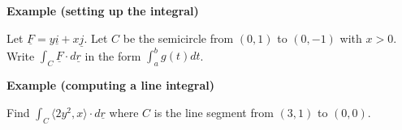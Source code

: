 \documentclass[12pt,letterpaper,noanswers]{exam}
\newcommand{\mb}[1]{\underline{#1}}
\begin{document}
\noindent\textbf{Example (setting up the integral)}

Let $\mb F = y\mb i + x\mb j$.  Let $C$ be the semicircle from $(0,1)$ to $(0,-1)$ with $x>0$.  Write $\displaystyle\int_C \mb F\cdot d\mb r$ in the form $\displaystyle\int_a^b g(t)dt$.
\vspace{1in}




\noindent\textbf{Example (computing a line integral)}

Find $\displaystyle\int_C \langle 2y^2,x\rangle\cdot d\mb r$ where $C$ is the line segment from $(3,1)$ to $(0,0)$.
\vspace{1.5in}


 
 

\end{document}
